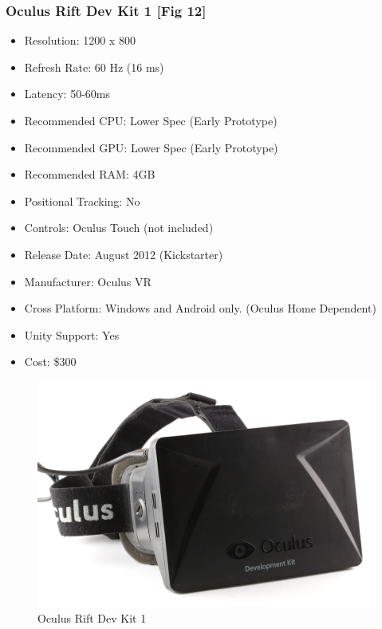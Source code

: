 \documentclass[a4paper,10pt]{article}
\begin{document}
\subsubsection{Oculus Rift Dev Kit 1 [Fig 12]}
\begin{itemize}
	\item Resolution: 1200 x 800
	\item Refresh Rate: 60 Hz (16 ms)
	\item Latency: 50-60ms
	\item Recommended CPU: Lower Spec (Early Prototype)
	\item Recommended GPU: Lower Spec (Early Prototype)
	\item Recommended RAM: 4GB
	\item Positional Tracking: No
	\item Controls: Oculus Touch (not included) 
	\item Release Date: August 2012 (Kickstarter)
	\item Manufacturer: Oculus VR
	\item Cross Platform: Windows and Android only. (Oculus Home Dependent)
	\item Unity Support: Yes
	\item Cost: \$300
\end{itemize}
	\begin{figure}[H]
	\includegraphics[width=\linewidth,height=\paperheight,keepaspectratio]{dk1.jpg}
	\caption{Oculus Rift Dev Kit 1}
	\label{fig:Riftdk1Img}
	\end{figure}
	\pagebreak
\end{document}
